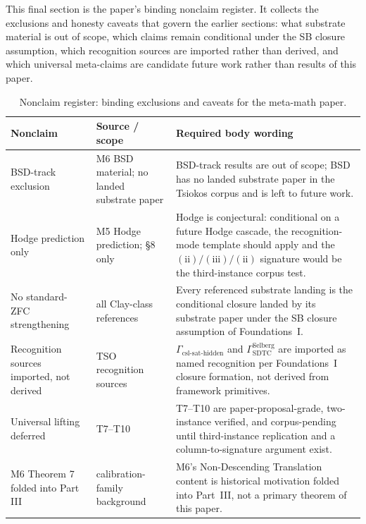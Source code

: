 \documentclass[11pt]{article}
\newcommand{\SigPattern}{$\mathrm{(ii)}/\mathrm{(iii)}/\mathrm{(ii)}$}
\theoremstyle{definition}
\begin{document}
This final section is the paper's binding nonclaim register.  It
collects the exclusions and honesty caveats that govern the earlier
sections: what substrate material is out of scope, which claims remain
conditional under the SB closure assumption, which recognition sources
are imported rather than derived, and which universal meta-claims are
candidate future work rather than results of this paper.

\begin{table}[H]
  \centering
  \caption{Nonclaim register: binding exclusions and caveats for the meta-math paper.}
  \label{tab:nonclaims}
  \scriptsize
  \renewcommand{\arraystretch}{1.08}
  \begin{tabularx}{\textwidth}{@{}>{\raggedright\arraybackslash}p{}>{\raggedright\arraybackslash}p{}>{\raggedright\arraybackslash}X@{}}
    \toprule
    Nonclaim & Source / scope & Required body wording \\
    \midrule
    BSD-track exclusion & M6 BSD material; no landed substrate paper & BSD-track results are out of scope; BSD has no landed substrate paper in the Tsiokos corpus and is left to future work. \\
    Hodge prediction only & M5 Hodge prediction; §8 only & Hodge is conjectural: conditional on a future Hodge cascade, the recognition-mode template should apply and the \SigPattern{} signature would be the third-instance corpus test. \\
    No standard-ZFC strengthening & all Clay-class references & Every referenced substrate landing is the conditional closure landed by its substrate paper under the SB closure assumption of Foundations~I. \\
    Recognition sources imported, not derived & TSO recognition sources & \(\Gamma_{\text{csl-sat-hidden}}\) and \(\Gamma_{\text{SDTC}}^{\text{Selberg}}\) are imported as named recognition per Foundations~I closure formation, not derived from framework primitives. \\
    Universal lifting deferred & T7--T10 & T7--T10 are paper-proposal-grade, two-instance verified, and corpus-pending until third-instance replication and a column-to-signature argument exist. \\
    M6 Theorem 7 folded into Part III & calibration-family background & M6's Non-Descending Translation content is historical motivation folded into Part~III, not a primary theorem of this paper. \\
    \bottomrule
  \end{tabularx}
\end{table}
 
\end{document}
